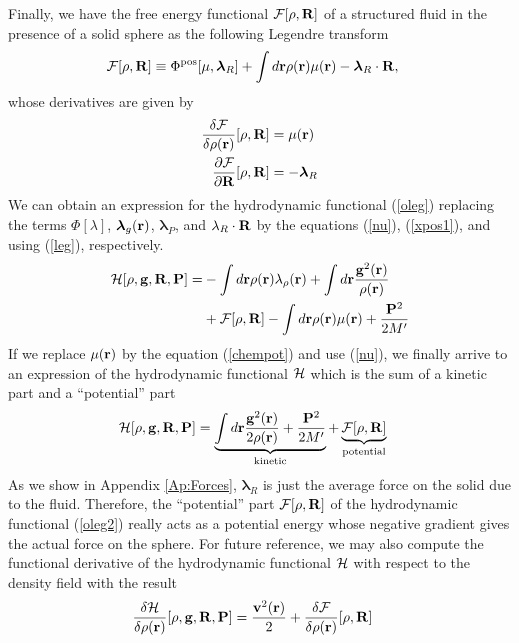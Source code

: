 \documentclass[b5paper,openright,10pt]{book}
\begin{document}
Finally, we have the free energy functional ${\cal  F}[\rho,{\bf R}]$ of a structured fluid in the presence of a solid sphere as the following Legendre transform
\begin{align}
  {\cal F}[\rho,{\bf R}]&\equiv  \Phi^{\rm pos}[\mu,\boldsymbol{\lambda}_R]
+
\int d{\bf r}\rho({\bf r})\mu({\bf r})-\boldsymbol{\lambda}_R\cdot{\bf R},
\label{leg}
\end{align}
whose derivatives are given by 
\begin{align}
   \frac{\delta {\cal F}}{\delta\rho({\bf r})}[\rho,{\bf R}] &=\mu({\bf r})
\nonumber\\
   \frac{\partial {\cal F}}{\partial{\bf R}}[\rho,{\bf R}] &=-\boldsymbol{\lambda}_R
\label{Fd2}
\end{align}
We can obtain an expression for the  hydrodynamic functional (\ref{oleg}) replacing the terms $\Phi[\lambda]$, $\boldsymbol{\lambda}_g({\bf r})$, $\boldsymbol{\lambda}_P$, and $\lambda_R\cdot{\bf R}$ by the equations (\ref{nu}), (\ref{xpos1}), and using (\ref{leg}), respectively.
\begin{align}
  {\cal H}[\rho,{\bf g},{\bf R},{\bf P}] =& 
  -\int d{\bf r} \rho({\bf r})\lambda_{\rho}({\bf r}) 
  +\int d{\bf r}\frac{{\bf g}^2({\bf r})}{\rho({\bf r})} 
  \nonumber\\
  &+ {\cal F}[\rho,{\bf R}] -\int d{\bf r}\rho({\bf r})\mu({\bf r}) + \frac{{\bf P}^2}{2M'}
\end{align}
If we replace $\mu({\bf r})$ by the equation (\ref{chempot}) and use (\ref{nu}), we finally arrive to an expression of the hydrodynamic functional ${\cal H}$ which is the sum of a kinetic part and a ``potential'' part
\begin{align}
  {\cal H}[\rho,{\bf g},{\bf R},{\bf P}] &=   
  \underbrace{\int d{\bf r}\frac{{\bf g}^2({\bf r})}{2\rho({\bf r})} +\frac{{\bf P}^2}{2M'}}_{\rm kinetic}
  +\underbrace{{\cal F}[\rho,{\bf R}]}_{\rm potential}
\label{oleg2}
\end{align}
As we show in Appendix \ref{Ap:Forces}, $\boldsymbol{\lambda}_R$
is just the  average force on the solid due  to the fluid.  Therefore,
the ``potential''  part ${\cal  F}[\rho,{\bf R}]$ of  the hydrodynamic
functional  (\ref{oleg2})  really  acts  as a  potential  energy  whose
negative gradient  gives the actual  force on the sphere.   For future
reference,  we  may also  compute  the  functional derivative  of  the
hydrodynamic functional ${\cal  H}$ with respect to  the density field
with the result
\begin{align}
  \frac{\delta {\cal H}}{\delta\rho({\bf r})}[\rho,{\bf g},{\bf R},{\bf P}] &=    
\frac{{\bf v}^2({\bf r})}{2}+  \frac{\delta {\cal F}}{\delta\rho({\bf r})}[\rho,{\bf R}]
\end{align}
\end{document}
